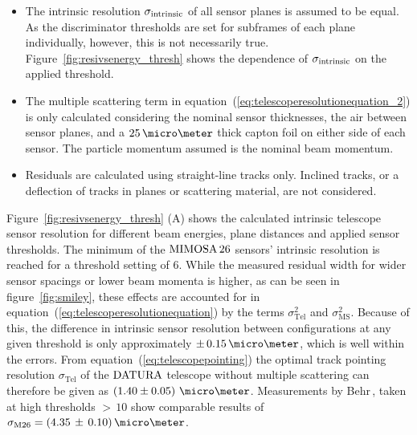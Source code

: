 \begin{itemize}
\item The intrinsic resolution $\sigma_{\textrm{intrinsic}}$ of all sensor planes is assumed to be equal.
As the discriminator thresholds are set for subframes of each plane individually, however, this is not necessarily true.
Figure~\ref{fig:resivsenergy_thresh} shows the dependence of $\sigma_{\textrm{intrinsic}}$ on the applied threshold.

\item The multiple scattering term in equation~(\ref{eq:telescoperesolutionequation_2}) is only calculated considering the nominal sensor thicknesses, the air between sensor planes,
 and a $25\,\micro\meter$ thick capton foil on either side of each sensor.
The particle momentum assumed is the nominal beam momentum.

\item Residuals are calculated using straight-line tracks only.
Inclined tracks, or a deflection of tracks in planes or scattering material, are not considered.
\end{itemize}

Figure~\ref{fig:resivsenergy_thresh} (A) shows the calculated intrinsic telescope sensor resolution for different beam energies, plane distances and applied sensor thresholds.
The minimum of the $\textrm{MIMOSA\,26}$ sensors' intrinsic resolution is reached for a threshold setting of $6$.
While the measured residual width for wider sensor spacings or lower beam momenta is higher, as can be seen in figure~\ref{fig:smiley},
 these effects are accounted for in equation~(\ref{eq:telescoperesolutionequation}) by the terms $\sigma_{\textrm{Tel}}^2$ and $\sigma_{\textrm{MS}}^2$.
Because of this, the difference in intrinsic sensor resolution between configurations at any given threshold is only approximately $\pm\,0.15\,\micro\meter$, which is well within the errors.
From equation~(\ref{eq:telescopepointing}) the optimal track pointing resolution $\sigma_{\textrm{Tel}}$ of the $\textrm{DATURA}$ telescope without multiple scattering
 can therefore be given as $\left( 1.40 \pm 0.05 \right)\,\micro\meter$.
Measurements by Behr\,\cite{ref:j.behrmeasurements}, taken at high thresholds $>\,10$ show comparable results of $\sigma_{\textrm{M26}} = (4.35\,\pm\,0.10)\,\micro\meter$.


